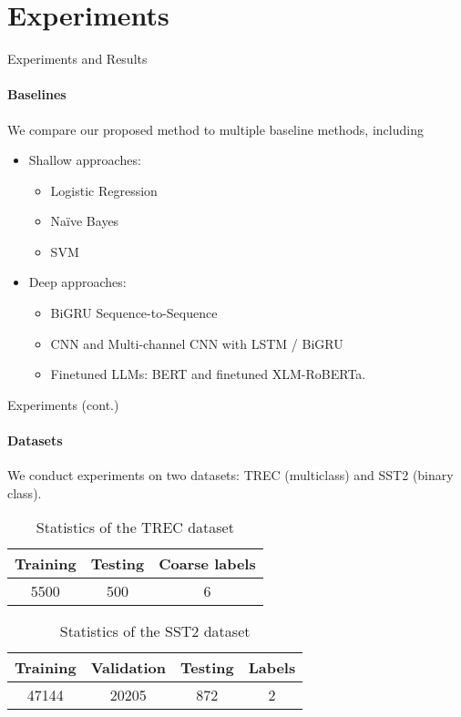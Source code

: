 \section{Experiments}
\begin{frame}{Experiments and Results}
\framesubtitle{Baselines}
We compare our proposed method to multiple baseline methods, including
\begin{itemize}
\item Shallow approaches:
\begin{itemize}
\item Logistic Regression
\item Na\"ive Bayes
\item SVM
\end{itemize}
\item Deep approaches:
\begin{itemize}
\item BiGRU Sequence-to-Sequence
\item CNN and Multi-channel CNN with LSTM / BiGRU
\item Finetuned LLMs: BERT and finetuned XLM-RoBERTa.
\end{itemize}
\end{itemize}
\end{frame}

\begin{frame}{Experiments (cont.)}
\framesubtitle{Datasets}

We conduct experiments on two datasets: TREC (multiclass) and SST2 (binary class).

\begin{table}
\centering
\begin{tabular}{|c|c|c|}\hline%
\textbf{Training} & \textbf{Testing} & \textbf{Coarse labels} \\ \hline%
5500              & 500              & 6                    \\ \hline %
\end{tabular}
\caption{Statistics of the TREC dataset\cite{hovy2001, li2002}} \label{tab:trec-insight}
\end{table}

\begin{table}
\centering
\begin{tabular}{|c|c|c|c|} \hline
\textbf{Training} & \textbf{Validation} & \textbf{Testing} & \textbf{Labels} \\ \hline
47144              & 20205              & 872                      & 2 \\ \hline
\end{tabular}
\caption{Statistics of the SST2 dataset\cite{Socher2013}} \label{tab:sst2-insight}
\end{table}
\end{frame}


